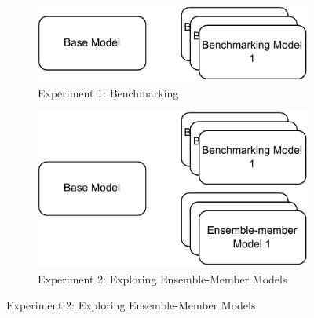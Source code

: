 \documentclass{article}
\begin{document}

\begin{figure}[htp]
    \centering
    \begin{subfigure}[htb]{0.49\textwidth}
        \centering
        \includegraphics[width=\textwidth ]{figures/exp_1}
        \caption{Experiment 1: Benchmarking}\label{fig:exp:exp_1}
    \end{subfigure}
    \hfill  
    \begin{subfigure}[htb]{0.49\textwidth}
        \centering
        \includegraphics[width=\textwidth]{figures/exp_2}
        \caption{Experiment 2: Exploring Ensemble-Member Models}\label{fig:exp:exp_2}
    \end{subfigure}
    
    \vspace{2em}
    

\end{figure}
\end{document}
